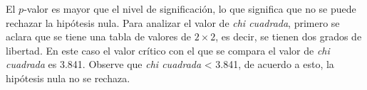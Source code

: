 \documentclass[12pt]{article}
\begin{document}
	El $p$-valor es mayor que el nivel de significación, lo que significa que no se puede rechazar la hipótesis nula. Para analizar el valor de {\em chi cuadrada}, primero se aclara que se tiene una tabla de valores de $2 \times 2$, es decir, se tienen dos grados de libertad. En este caso el valor crítico con el que se compara el valor de {\em chi cuadrada} es 3.841. Observe que {\em chi cuadrada} < 3.841, de acuerdo a esto, la hipótesis nula no se rechaza.
	


\end{document}

